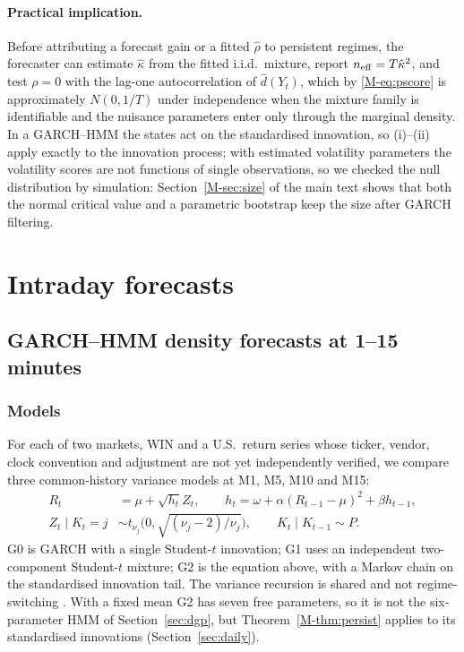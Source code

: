 \documentclass[11pt,a4paper]{article}
\theoremstyle{plain}
\theoremstyle{remark}
\begin{document}
\paragraph{Practical implication.} Before attributing a forecast gain or a fitted $\hat\rho$ to persistent regimes, the forecaster can estimate $\hat\kappa$ from the fitted i.i.d.\ mixture, report $n_{\rm eff}=T\hat\kappa^2$, and test $\rho=0$ with the lag-one autocorrelation of $\hat d(Y_t)$, which by \eqref{M-eq:pscore} is approximately $N(0,1/T)$ under independence when the mixture family is identifiable and the nuisance parameters enter only through the marginal density. In a GARCH--HMM the states act on the standardised innovation, so (i)--(ii) apply exactly to the innovation process; with estimated volatility parameters the volatility scores are not functions of single observations, so we checked the null distribution by simulation: Section~\ref{M-sec:size} of the main text shows that both the normal critical value and a parametric bootstrap keep the size after GARCH filtering.

\section{Intraday forecasts}\label{sec:garch}

\subsection{GARCH--HMM density forecasts at 1--15 minutes}

\subsubsection{Models}
For each of two markets, WIN and a U.S.\ return series whose ticker, vendor, clock convention and adjustment are not yet independently verified, we compare three common-history variance models at M1, M5, M10 and M15:
\begin{align}
R_t&=\mu+\sqrt{h_t}Z_t,\qquad h_t=\omega+\alpha(R_{t-1}-\mu)^2+\beta h_{t-1},\\
Z_t\mid K_t=j&\sim t_{\nu_j}\Big(0,\sqrt{(\nu_j-2)/\nu_j}\Big),\qquad K_t\mid K_{t-1}\sim P.
\end{align}
G0 is GARCH with a single Student-$t$ innovation; G1 uses an independent two-component Student-$t$ mixture; G2 is the equation above, with a Markov chain on the standardised innovation tail. The variance recursion is shared and not regime-switching \citep[cf.][]{gray1996,haas2004}. With a fixed mean G2 has seven free parameters, so it is not the six-parameter HMM of Section~\ref{sec:dgp}, but Theorem~\ref{M-thm:persist} applies to its standardised innovations (Section~\ref{sec:daily}).
\end{document}
